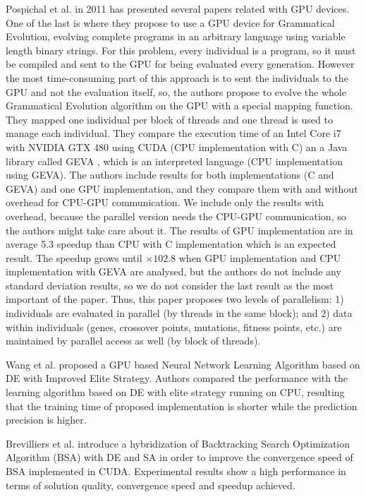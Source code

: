 \documentclass{article}
\begin{document}
Pospichal et al. in 2011 has presented several papers related with GPU devices. One of the last is \cite{DBLP:conf/gecco/PospichalMOSJ11} where they propose to use a GPU device for Grammatical Evolution, evolving complete programs in an arbitrary language using variable length binary strings. For this problem, every individual is a program, so it must be compiled and sent to the GPU for being evaluated every generation. However the most time-consuming part of this approach is to sent the individuals to the GPU and not the evaluation itself, so, the authors propose to evolve the whole Grammatical Evolution algorithm on the GPU with a special mapping function. They mapped one individual per block of threads and one thread is used to manage each individual. They compare the execution time of an Intel Core i7 with NVIDIA GTX 480 using CUDA (CPU implementation with C) an a Java library called GEVA \cite{O'Neill:2008:GGE:1527063.1527066}, which is an interpreted language (CPU implementation using GEVA).  The authors include results for both implementations (C and GEVA) and one GPU implementation, and they compare them with and without overhead for CPU-GPU communication. We include only the results with overhead, because the parallel version needs the CPU-GPU communication, so the authors might take care about it. The results of GPU implementation are in average 5.3 speedup than CPU with C implementation which is an expected result. The speedup grows until $\times102.8$ when GPU implementation and CPU implementation with GEVA are analysed, but the authors do not include any standard deviation results, so we do not consider the last result as the most important of the paper. Thus, this paper proposes two levels of parallelism: 1) individuals are evaluated in parallel (by threads in the same block); and 2) data within individuals (genes, crossover points, mutations, fitness points, etc.) are maintained by parallel access as well (by block of threads).

Wang et al. \cite{Wang129} proposed a GPU based Neural Network Learning Algorithm based on DE with Improved Elite Strategy. Authors compared the performance with the learning algorithm based on DE with elite strategy running on CPU, resulting that the training time of proposed implementation is shorter while the prediction precision is higher.

Brevilliers et al. \cite{Brevilliers2016} introduce a hybridization of Backtracking Search Optimization Algorithm (BSA) with DE and SA in order to improve the convergence speed of BSA implemented in CUDA. Experimental results show a high performance in terms of solution quality, convergence speed and speedup achieved.
\end{document}
